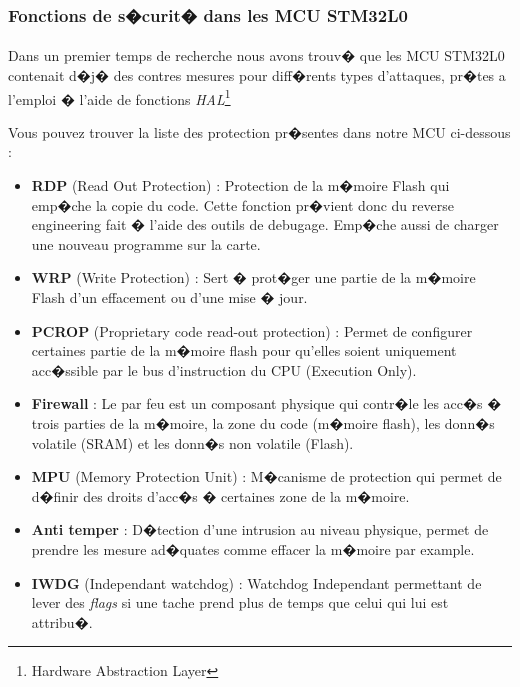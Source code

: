 \documentclass[a4paper, titlepage,12pt]{report}
\begin{document}
\subsubsection{Fonctions de s�curit� dans les MCU STM32L0}
\paragraph{}
Dans un premier temps de recherche nous avons trouv� que les MCU STM32L0 contenait d�j� des contres mesures pour diff�rents types d'attaques, pr�tes a l'emploi � l'aide de fonctions \textit{HAL}\footnote{Hardware Abstraction Layer}

Vous pouvez trouver la liste des protection pr�sentes dans notre MCU ci-dessous :

\begin{itemize}
\item \textbf{RDP} (Read Out Protection) : Protection de la m�moire Flash qui emp�che la copie du code. Cette fonction pr�vient donc du reverse engineering fait � l'aide des outils de debugage. Emp�che aussi de charger une nouveau programme sur la carte.

\item \textbf{WRP} (Write Protection) : Sert � prot�ger une partie de la m�moire Flash d'un effacement ou d'une mise � jour.

\item \textbf{PCROP} (Proprietary code read-out protection) : Permet de configurer certaines partie de la m�moire flash pour qu'elles soient uniquement acc�ssible par le bus d'instruction du CPU (Execution Only).

\item \textbf{Firewall} : Le par feu est un composant physique qui contr�le les acc�s � trois parties de la m�moire, la zone du code (m�moire flash), les donn�s volatile (SRAM) et les donn�s non volatile (Flash).

\item \textbf{MPU} (Memory Protection Unit) : M�canisme de protection qui permet de d�finir des droits d'acc�s � certaines zone de la m�moire.

\item \textbf{Anti temper} : D�tection d'une intrusion au niveau physique, permet de prendre les mesure ad�quates comme effacer la m�moire par example.

\item \textbf{IWDG} (Independant watchdog) : Watchdog Independant permettant de lever des \textit{flags} si une tache prend plus de temps que celui qui lui est attribu�.
\end{itemize}
\end{document}
